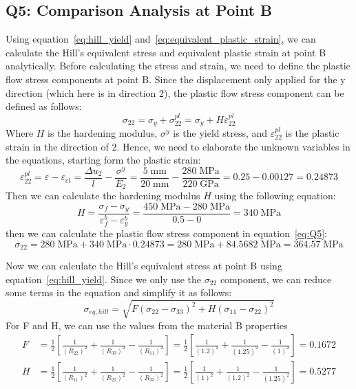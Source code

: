 \documentclass[12pt]{article}
\begin{document}
\subsection*{Q5: Comparison Analysis at Point B}
Using equation~\ref{eq:hill_yield} and~\ref{eq:equivalent_plastic_strain}, we can calculate the Hill's equivalent stress and 
equivalent plastic strain at point B analytically. Before calculating the stress and strain, 
we need to define the plastic flow stress components at point B. Since the displacement only applied for 
the y direction (which here is in direction 2), 
the plastic flow stress component can be defined as follows:
\begin{equation}
    \sigma_{22} = \sigma_{y} + \sigma_{22}^{pl} = \sigma_{y} + H\varepsilon_{22}^{pl}
    \label{eq:Q5}
\end{equation}
Where $H$ is the hardening modulus, $\sigma^y$ is the yield stress, and $\varepsilon_{22}^{pl}$ is the plastic strain in the direction of 2.
Hence, we need to elaborate the unknown variables in the equations, starting form the plastic strain:
\begin{equation}
    \varepsilon_{22}^{pl} = \varepsilon - \varepsilon_{el} = \frac{\Delta u_{2}}{l} - \frac{\sigma^y}{E_{2}} = \frac{5 \;\text{mm}}{20 \;\text{mm}} - \frac{280 \;\text{MPa}}{220 \;\text{GPa}} = 0.25 - 0.00127 = 0.24873
\end{equation}
Then we can calculate the hardening modulus $H$ using the following equation:
\begin{equation}
    H = \frac{\sigma_{f} - \sigma_{y}}{\varepsilon_{f}^{b} - \varepsilon_{y}^{b}} = \frac{450 \;\text{MPa} - 280 \;\text{MPa}}{0.5 - 0} = 340 \;\text{MPa}
\end{equation}  
then we can calculate the plastic flow stress component in equation~\ref{eq:Q5}:
\begin{equation}
    \sigma_{22} = 280 \;\text{MPa} + 340 \;\text{MPa} \cdot 0.24873 = 280 \;\text{MPa} + 84.5682 \;\text{MPa} = 364.57 \;\text{MPa}  
\end{equation}

Now we can calculate the Hill's equivalent stress at point B using equation~\ref{eq:hill_yield}. Since we only use the $\sigma_{22}$ component, we can
reduce some terms in the equation and simplify it as follows:
\begin{equation}
    \sigma_{eq, hill} = \sqrt{F(\sigma_{22}-\sigma_{33})^2 + H(\sigma_{11}-\sigma_{22})^2}
\end{equation}
For F and H, we can use the values from the material B properties
\begin{align*}
F &= \frac{1}{2} \left[ \frac{1}{(R_{22})^2} + \frac{1}{(R_{33})^2} - \frac{1}{(R_{11})^2} \right] = \frac{1}{2} \left[ \frac{1}{(1.2)^2} + \frac{1}{(1.25)^2} - \frac{1}{(1)^2} \right] = 0.1672\\
H &= \frac{1}{2} \left[ \frac{1}{(R_{11})^2} + \frac{1}{(R_{22})^2} - \frac{1}{(R_{33})^2} \right] = \frac{1}{2} \left[ \frac{1}{(1)^2} + \frac{1}{(1.2)^2} - \frac{1}{(1.25)^2} \right] = 0.5277
\end{align*}    
\end{document}
